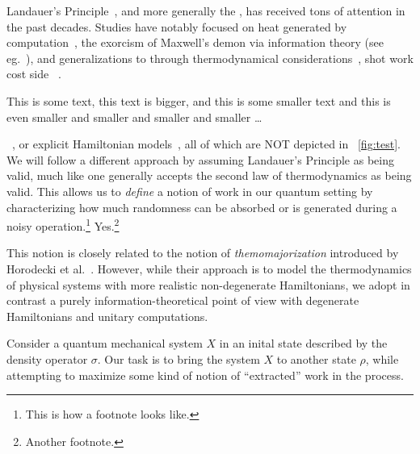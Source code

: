\documentclass[11pt,a4paper]{article}
\theoremstyle{plain}
\begin{document}
Landauer's Principle~\cite{Landauer1961_5392446Erasure}, and more generally the
,
 \jd has received tons of attention \endjd in the
past decades.  Studies have notably focused on heat generated by
computation~\cite{Bennett1982IJTP_ThermodynOfComp}, the exorcism of Maxwell's
demon via information theory (see eg.~\cite{Bennett2003_NotesLP}), and
generalizations to 
through thermodynamical considerations~\cite{Oppenheim2002PRL_thermodynamical},
 shot work cost 
 side ~\cite{delRio2011Nature}.

This is some text, {\notesmaller[1.2] this text is bigger, {\notesmaller[0.8] and this is
    some smaller text {\notesmaller and this is even smaller {\notesmaller and smaller
        {\notesmaller and smaller {\notesmaller and smaller \ldots}}}}}}

 ~\cite{Szilard1929ZeitschriftFuerPhysik,Dahlsten2011NJP_inadequacy}, or explicit
Hamiltonian models~\cite{Alicki2004_hamiltonian}, all of which are NOT depicted in
\figurename~\ref{fig:test}. We will follow a different approach by assuming Landauer's
Principle as being valid, much like one generally accepts the second law of thermodynamics
as being valid. This allows us to {\em define} a notion of work in our quantum setting by
characterizing how much randomness can be absorbed or is generated during a noisy
operation.\footnote{This is how a footnote looks like.} Yes.\footnote{Another footnote.}

This notion is closely related to the notion of {\em themomajorization} introduced by
Horodecki et al.~\cite{Horodecki2013_ThermoMaj}. However, while their approach is to model
the thermodynamics of physical systems with more realistic non-degenerate Hamiltonians, we
adopt in contrast a purely information-theoretical point of view with degenerate
Hamiltonians and unitary computations.

Consider a quantum mechanical system $X$ in an inital state described by the density operator $\sigma$.
Our task is to bring the system $X$ to another state $\rho$, while attempting to maximize some kind of notion
of ``extracted'' work in the process.
\end{document}
